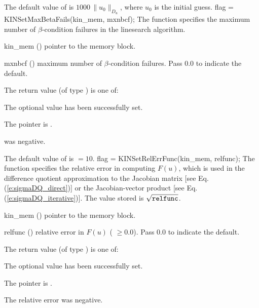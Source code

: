{
  The default value of  is $1000\, \| u_0 \|_{D_u}$,
  where $u_0$ is the initial guess.
}
{
flag = KINSetMaxBetaFails(kin\_mem, mxnbcf);
}
{
  The function  specifies the maximum number of
  $\beta$-condition failures in the linesearch algorithm.
}
{
  \begin{args}
  \item[kin\_mem] ()
    pointer to the {\kinsol} memory block.
  \item[mxnbcf] ()
    maximum number of $\beta$-condition failures.  Pass $0.0$ to indicate the
    default.
  \end{args}
}
{
  The return value  (of type ) is one of:
  \begin{args}
  \item[\Id{KIN\_SUCCESS}]
    The optional value has been successfully set.
  \item[\Id{KIN\_MEM\_NULL}]
    The  pointer is .
  \item[\Id{KIN\_ILL\_INPUT}]
     was negative.
  \end{args}
}
{
  The default value of  is  $=10$.
}
{
flag = KINSetRelErrFunc(kin\_mem, relfunc);
}
{
  The function  specifies the relative error in
  computing $F(u)$, which is used in the difference quotient approximation to
  the Jacobian matrix [see Eq.(\ref{e:sigmaDQ_direct})] or the Jacobian-vector
  product [see Eq.(\ref{e:sigmaDQ_iterative})]. The value stored is
  $\sqrt{{\tt relfunc}}$.
}
{
  \begin{args}[relfunc]
  \item[kin\_mem] ()
    pointer to the {\kinsol} memory block.
  \item[relfunc] ()
    relative error in $F(u)$ ( $\geq 0.0$).  Pass $0.0$ to indicate
    the default.
  \end{args}
}
{
  The return value  (of type ) is one of:
  \begin{args}
  \item[\Id{KIN\_SUCCESS}]
    The optional value has been successfully set.
  \item[\Id{KIN\_MEM\_NULL}]
    The  pointer is .
  \item[\Id{KIN\_ILL\_INPUT}]
    The relative error was negative.
  \end{args}
}
